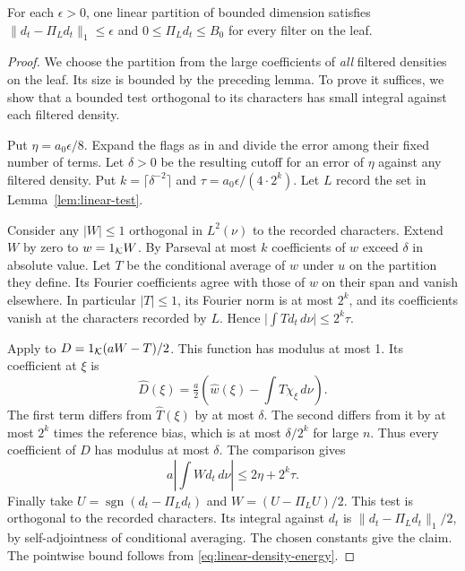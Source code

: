 \begin{proposition}\label{prop:all-filter-partition}
For each \(\epsilon>0\), one linear partition of bounded dimension
satisfies \(\|d_t-\Pi_Ld_t\|_1\le\epsilon\) and
\(0\le\Pi_Ld_t\le B_0\) for every filter on the leaf.
\end{proposition}
\begin{proof}
We choose the partition from the large coefficients of \emph{all}
filtered densities on the leaf. Its size is bounded by the preceding
lemma. To prove it suffices, we show that a bounded test orthogonal
to its characters has small integral against each filtered density.

Put \(\eta=a_0\epsilon/8\). Expand the flags as in
 and divide the error among their fixed number
of terms. Let \(\delta>0\) be the resulting cutoff for an error of
\(\eta\) against any filtered density.
Put \(k=\lceil\delta^{-2}\rceil\) and
\(\tau=a_0\epsilon/(4\cdot2^k)\). Let \(L\) record the set in
Lemma~\ref{lem:linear-test}.

Consider any \(|W|\le1\) orthogonal in \(L^2(\nu)\) to the recorded
characters. Extend \(W\) by zero to \(w=1_{\mathcal K}W\).
By Parseval at most \(k\) coefficients of \(w\) exceed \(\delta\) in
absolute value. Let \(T\) be the conditional average of \(w\) under
\(u\) on the partition they define. Its Fourier coefficients agree with
those of \(w\) on their span and vanish elsewhere. In particular
\(|T|\le1\), its Fourier norm is at most \(2^k\), and its coefficients
vanish at the characters recorded by \(L\). Hence
\(\big|\int T d_t\,d\nu\big|\le2^k\tau\).

Apply  to \(D=1_{\mathcal K}(aW-T)/2\).
This function has modulus at most 1. Its coefficient at \(\xi\) is
\[
  \widehat D(\xi)=\tfrac a2
     \left(\widehat w(\xi)-\int T\chi_\xi\,d\nu\right).
\]
The first term differs from \(\widehat T(\xi)\) by at most \(\delta\).
The second differs from it by at most \(2^k\) times the reference bias,
which is at most \(\delta/2^k\) for large \(n\). Thus every coefficient
of \(D\) has modulus at most \(\delta\). The comparison gives
\[
 a\left|\int W d_t\,d\nu\right|\le 2\eta+2^k\tau.
\]
Finally take \(U=\operatorname{sgn}(d_t-\Pi_Ld_t)\) and
\(W=(U-\Pi_LU)/2\). This test is orthogonal to the recorded characters.
Its integral against \(d_t\) is \(\|d_t-\Pi_Ld_t\|_1/2\), by
self-adjointness of conditional averaging. The chosen constants give the
claim. The pointwise bound follows from \eqref{eq:linear-density-energy}.
\end{proof}

